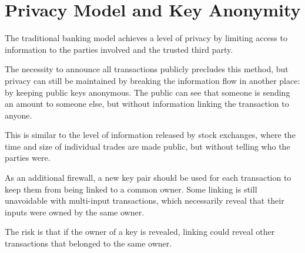 \documentclass{article}
\begin{document}
\section{Privacy Model and Key Anonymity}

The traditional banking model achieves a level of privacy by limiting access to information to the parties involved and the trusted third party.

The necessity to announce all transactions publicly precludes this method, but privacy can still be maintained by breaking the information flow in another place: by keeping public keys anonymous. The public can see that someone is sending an amount to someone else, but without information linking the transaction to anyone.

This is similar to the level of information released by stock exchanges, where the time and size of individual trades are made public, but without telling who the parties were.

As an additional firewall, a new key pair should be used for each transaction to keep them from being linked to a common owner. Some linking is still unavoidable with multi-input transactions, which necessarily reveal that their inputs were owned by the same owner.

The risk is that if the owner of a key is revealed, linking could reveal other transactions that belonged to the same owner.
\end{document}
